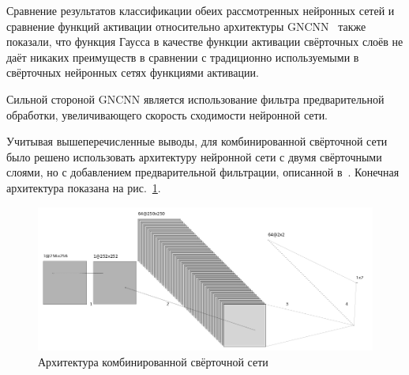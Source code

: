 Сравнение результатов классификации обеих рассмотренных нейронных сетей и сравнение функций активации относительно архитектуры GNCNN~\cite{Qian2017} также показали, что функция Гаусса в качестве функции активации свёрточных слоёв не даёт никаких преимуществ в сравнении с традиционно используемыми в свёрточных нейронных сетях функциями активации.

Сильной стороной GNCNN является использование фильтра предварительной обработки, увеличивающего скорость сходимости нейронной сети.

Учитывая вышеперечисленные выводы, для комбинированной свёрточной сети было решено использовать архитектуру нейронной сети с двумя свёрточными слоями, но с добавлением предварительной фильтрации, описанной в~\cite{GNCNN}. Конечная архитектура показана на рис.~\ref{fig:MixedCNNArchitecture}.

\begin{figure}[!htb]
\centering
\includegraphics[width=1\textwidth]{include/graphics/mixed_gray_architecture}
\caption{Архитектура комбинированной свёрточной сети}
\label{fig:MixedCNNArchitecture}
\end{figure}

\clearpage
